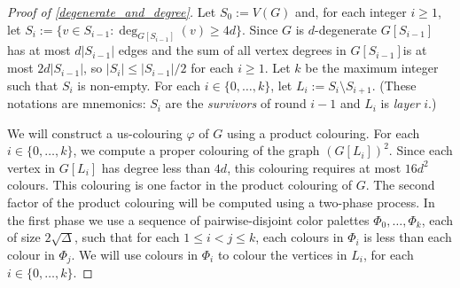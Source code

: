 \documentclass[kpfonts]{patmorin}
\newcommand{\defin}[1]{\emph{\color{brightmaroon}#1}}
\begin{document}
\begin{proof}[Proof of \cref{degenerate_and_degree}]
  Let $S_0:=V(G)$ and, for each integer $i\ge 1$, let $S_i:=\{v\in S_{i-1}:\deg_{G[S_{i-1}]}(v)\ge 4d\}$.  Since $G$ is $d$-degenerate $G[S_{i-1}]$ has at most $d|S_{i-1}|$ edges and the sum of all vertex degrees in $G[S_{i-1}]$is at most $2d|S_{i-1}|$, so $|S_i|\le |S_{i-1}|/2$ for each $i\ge 1$.  Let $k$ be the maximum integer such that $S_i$ is non-empty.  For each $i\in\{0,\ldots,k\}$, let $L_i:=S_i\setminus S_{i+1}$.  (These notations are mnemonics: $S_i$ are the \defin{survivors} of round $i-1$ and $L_i$ is \defin{layer} $i$.)

  We will construct a us-colouring $\varphi$ of $G$ using a product colouring.  For each $i\in\{0,\ldots,k\}$, we compute a proper colouring of the graph $(G[L_i])^2$.  Since each vertex in $G[L_i]$ has degree less than $4d$,
  this colouring requires at most $16d^2$ colours.  This colouring is one factor in the product colouring of $G$.
  The second factor of the product colouring will be computed using a two-phase process. In the first phase we use a sequence of pairwise-disjoint color palettes $\Phi_0,\ldots,\Phi_{k}$, each of size $2\sqrt{\Delta}$, such that for each $1\le i < j\le k$, each colours in $\Phi_i$ is less than each colour in $\Phi_j$.  We will use colours in $\Phi_i$ to colour the vertices in $L_i$, for each $i\in\{0,\ldots,k\}$.



\end{proof}
\end{document}
